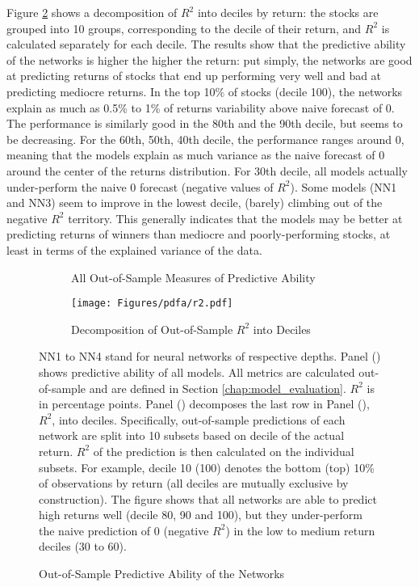 		Figure \ref{fig:r2} shows a decomposition of $R^2$ into deciles by return: the stocks are grouped into 10 groups, corresponding to the decile of their return, and $R^2$ is calculated separately for each decile. The results show that the predictive ability of the networks is higher the higher the return: put simply, the networks are good at predicting returns of stocks that end up performing very well and bad at predicting mediocre returns. In the top 10\% of stocks (decile 100), the networks explain as much as  0.5\% to 1\% of returns variability above naive forecast of 0. The performance is similarly good in the 80th and the 90th decile, but seems to be decreasing. For the 60th, 50th, 40th decile, the performance ranges around 0, meaning that the models explain as much variance as the naive forecast of 0 around the center of the returns distribution. For 30th decile, all models actually under-perform the naive 0 forecast (negative values of $R^2$). Some models (NN1 and NN3) seem to improve in the lowest decile, (barely) climbing out of the negative $R^2$ territory. This generally indicates that the models may be better at predicting returns of winners than mediocre and poorly-performing stocks, at least in terms of the explained variance of the data.    
		
		\begin{figure}	
			\centering		
			\begin{subfigure}[t]{\textwidth}
				\centering	
				
				\caption{All Out-of-Sample Measures of Predictive Ability}
				\label{tab:performance}
			\end{subfigure}
			
			\begin{subfigure}[t]{\textwidth}
				\texttt{[image: Figures/pdfa/r2.pdf]}
				\caption{Decomposition of Out-of-Sample $R^2$ into Deciles}
				\label{fig:r2}
			\end{subfigure}
			\caption{Out-of-Sample Predictive Ability of the Networks}
			\medskip
			\small
			NN1 to NN4 stand for neural networks of respective depths. Panel () shows predictive ability of all models. All metrics are calculated out-of-sample and are defined in Section \ref{chap:model_evaluation}. $R^2$ is in percentage points. Panel () decomposes the last row in Panel (), $R^2$, into deciles. Specifically, out-of-sample predictions of each network are split into 10 subsets based on decile of the actual return. $R^2$ of the prediction is then calculated on the individual subsets. For example, decile 10 (100) denotes the bottom (top) 10\% of observations by return (all deciles are mutually exclusive by construction). The figure shows that all networks are able to predict high returns well (decile 80, 90 and 100), but they under-perform the naive prediction of 0 (negative $R^2$) in the low to medium return deciles (30 to 60). 
			\label{fig:predictive_ability}
		\end{figure}     
		

